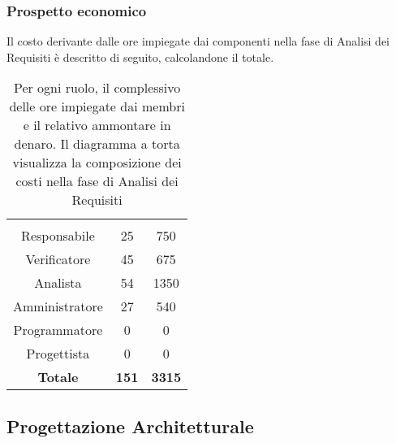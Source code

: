 \subsubsection{Prospetto economico}
Il costo derivante dalle ore impiegate dai componenti nella fase di Analisi dei Requisiti è descritto di seguito, calcolandone il totale.

\begin{table}[H]
	{\setlength{\parindent}{0cm}
		\begin{minipage}{.43\textwidth}
			\begin{tabular}{ccc}
				\rowcolorhead
				\headertitle{Ruolo} & \headertitle{Ore} & \headertitle{Costo(€)}\\
				Responsabile & 25 & 750\\
				Verificatore & 45 & 675\\
				Analista & 54 & 1350\\
				Amministratore & 27 & 540\\
				Programmatore & 0 & 0\\
				Progettista & 0 & 0\\
				\hline
				\textbf{Totale} & \textbf{151} & \textbf{3315}\\
			\end{tabular}
		\end{minipage}%
		\begin{minipage}{.57\textwidth}
	\end{minipage} }
	\caption[Prospetto economico della fase di Analisi dei Requisiti]{Per ogni ruolo, il complessivo delle ore impiegate dai membri e il relativo ammontare in denaro. Il diagramma a torta visualizza la composizione dei costi nella fase di Analisi dei Requisiti}
\end{table}




\subsection{Progettazione Architetturale}

